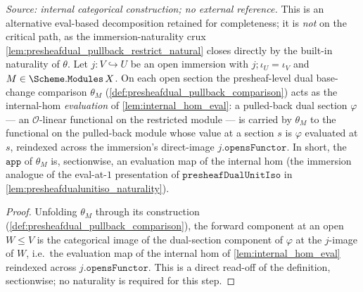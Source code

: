 \begin{lemma}\leanok
  \label{lem:presheafdual_pullback_comparison_eval_apply}
  \textit{Source: internal categorical construction; no external reference.}
  This is an alternative eval-based decomposition retained for completeness; it is \emph{not} on the
  critical path, as the immersion-naturality crux \cref{lem:presheafdual_pullback_restrict_natural}
  closes directly by the built-in naturality of \(\theta\).
  Let \(j : V \hookrightarrow U\) be an open immersion with \(j \mathbin{;} \iota_U = \iota_V\) and
  \(M \in \Scheme.\mathtt{Modules}\,X\). On each open section the presheaf-level dual base-change
  comparison \(\theta_M\) (\cref{def:presheafdual_pullback_comparison})
  acts as the internal-hom \emph{evaluation} of \cref{lem:internal_hom_eval}: a pulled-back dual
  section \(\varphi\) --- an \(\mathcal{O}\)-linear functional on the restricted module --- is carried
  by \(\theta_M\) to the functional on the pulled-back module whose value at a section \(s\) is
  \(\varphi\) evaluated at \(s\), reindexed across the immersion's direct-image
  \(j.\mathtt{opensFunctor}\). In short, the \(\mathtt{app}\) of \(\theta_M\) is, sectionwise, an
  evaluation map of the internal hom (the immersion analogue of the eval-at-\(1\) presentation of
  \(\mathtt{presheafDualUnitIso}\) in \cref{lem:presheafdualunitiso_naturality}).
\end{lemma}
\begin{proof}
  \leanok
  Unfolding \(\theta_M\) through its construction (\cref{def:presheafdual_pullback_comparison}), the forward
  component at an open \(W \le V\) is the categorical image of the dual-section component of
  \(\varphi\) at the \(j\)-image of \(W\), i.e.\ the evaluation map of the internal hom of
  \cref{lem:internal_hom_eval} reindexed across \(j.\mathtt{opensFunctor}\). This is a direct
  read-off of the definition, sectionwise; no naturality is required for this step.
\end{proof}

